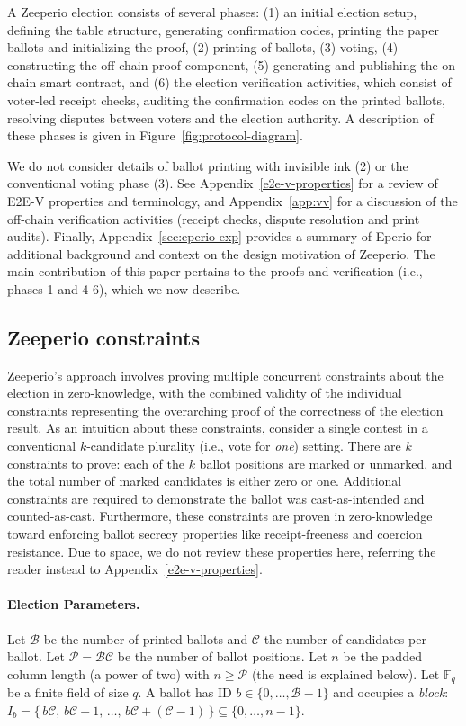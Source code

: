 A Zeeperio election consists of several phases: (1) an initial election setup, defining the table structure, generating confirmation codes, printing the paper ballots and initializing the proof, (2) printing of ballots, (3) voting, (4) constructing the off-chain proof component, (5) generating and publishing the on-chain smart contract, and (6) the election verification activities, which consist of voter-led receipt checks, auditing the confirmation codes on the printed ballots, resolving disputes between voters and the election authority. A description of these phases is given in Figure~\ref{fig:protocol-diagram}.

We do not consider details of ballot printing with invisible ink (2) or the conventional voting phase (3). See Appendix~\ref{e2e-v-properties} for a review of E2E-V properties and terminology, and Appendix~\ref{app:vv} for a discussion of the off-chain verification activities (receipt checks, dispute resolution and print audits). Finally, Appendix~\ref{sec:eperio-exp} provides a summary of Eperio for additional background and context on the design motivation of Zeeperio. The main contribution of this paper pertains to the proofs and verification (i.e., phases 1 and 4-6), which we now describe.


\subsection{Zeeperio constraints} 

Zeeperio's approach involves proving multiple concurrent constraints about the election in zero-knowledge, with the combined validity of the individual constraints representing the overarching proof of the correctness of the election result. As an intuition about these constraints, consider a single contest in a conventional $k$-candidate plurality (i.e., vote for {\em one}) setting. There are $k$ constraints to prove: each of the $k$ ballot positions are marked or unmarked, and the total number of marked candidates is either zero or one. Additional constraints are required to demonstrate the ballot was cast-as-intended and counted-as-cast. Furthermore, these constraints are proven in zero-knowledge toward enforcing ballot secrecy properties like receipt-freeness and coercion resistance. Due to space, we do not review these properties here, referring the reader instead to Appendix~\ref{e2e-v-properties}.


\paragraph{Election Parameters.}
Let $\mathcal{B}$ be the number of printed ballots and $\mathcal{C}$ the number of candidates per ballot. 
Let $\mathcal{P}=\mathcal{B}\mathcal{C}$ be the number of ballot positions. 
Let $n$ be the padded column length (a power of two) with $n\ge \mathcal{P}$ (the need is explained below). 
Let $\mathbb{F}_q$ be a finite field of size $q$. 
A ballot has ID $b\in\{0,\dots,\mathcal{B}-1\}$ and occupies a \emph{block}: $I_b=\{\,b\mathcal{C},\,b\mathcal{C}+1,\,\dots,\,b\mathcal{C}+(\mathcal{C}-1)\,\}\subseteq\{0,\dots,n-1\}.$

